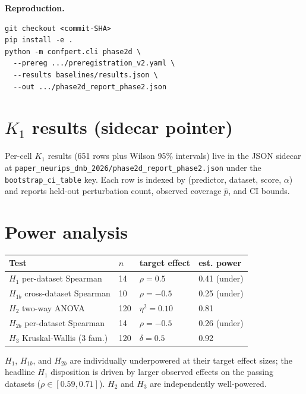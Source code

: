 \documentclass{article}
\begin{document}
\noindent\textbf{Reproduction.}
\begin{small}
\begin{verbatim}
git checkout <commit-SHA>
pip install -e .
python -m confpert.cli phase2d \
  --prereg .../preregistration_v2.yaml \
  --results baselines/results.json \
  --out .../phase2d_report_phase2.json
\end{verbatim}
\end{small}

\section{$K_1$ results (sidecar pointer)}
\label{sec:k1full}

Per-cell $K_1$ results (651 rows plus Wilson 95\% intervals) live
in the JSON sidecar at
\texttt{paper\_neurips\_dnb\_2026/phase2d\_report\_phase2.json}
under the \texttt{bootstrap\_ci\_table} key. Each row is indexed by
(predictor, dataset, score, $\alpha$) and reports held-out
perturbation count, observed coverage $\hat p$, and CI bounds.

\section{Power analysis}
\label{sec:power}

\begin{center}
\begin{tabular}{llll}
\toprule
Test & $n$ & target effect & est. power \\
\midrule
$H_1$ per-dataset Spearman       & 14  & $\rho = 0.5$  & 0.41 (under) \\
$H_{1b}$ cross-dataset Spearman  & 10  & $\rho = -0.5$ & 0.25 (under) \\
$H_2$ two-way ANOVA              & 120 & $\eta^2 = 0.10$ & 0.81 \\
$H_{2b}$ per-dataset Spearman    & 14  & $\rho = -0.5$ & 0.26 (under) \\
$H_3$ Kruskal-Wallis (3 fam.)    & 120 & $\delta = 0.5$ & 0.92 \\
\bottomrule
\end{tabular}
\end{center}

$H_1$, $H_{1b}$, and $H_{2b}$ are individually underpowered at
their target effect sizes; the headline $H_1$ disposition is
driven by larger observed effects on the passing datasets
($\rho \in [0.59, 0.71]$). $H_2$ and $H_3$ are independently
well-powered.
\end{document}
